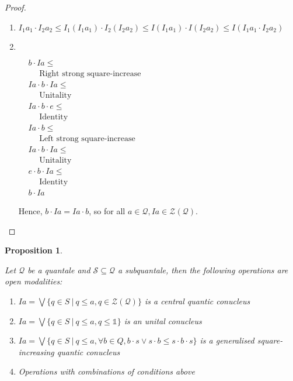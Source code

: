 \documentclass[a4paper]{article}
\theoremstyle{defin}
\theoremstyle{theorem}
\theoremstyle{prop}
\newtheorem{prop}{Proposition}
\theoremstyle{lemma}
\theoremstyle{ex}
\theoremstyle{col}
\begin{document}
\begin{proof}
$ $

\begin{enumerate}
  \item $I_1 a_1 \cdot I_2 a_2 \leq I_1 (I_1 a_1) \cdot I_2 (I_2 a_2) \leq I (I_1 a_1) \cdot I (I_2 a_2) \leq I (I_1 a_1 \cdot I_2 a_2)$
  \item $ $

    $\begin{array}{lll}
    & b \cdot I a \leq & \\
    & \:\:\:\:\:\: \text{Right strong square-increase}& \\
    &I a \cdot b \cdot I a \leq & \\
    & \:\:\:\:\:\: \text{Unitality}& \\
    & I a \cdot b \cdot e \leq & \\
    & \:\:\:\:\:\: \text{Identity}& \\
    &I a \cdot b \leq & \\
    & \:\:\:\:\:\: \text{Left strong square-increase}& \\
    &I a \cdot b \cdot I a \leq & \\
    & \:\:\:\:\:\: \text{Unitality}& \\
    &e \cdot b \cdot I a \leq & \\
    & \:\:\:\:\:\: \text{Identity}& \\
    &b \cdot I a&
    \end{array}$

  Hence, $b \cdot I a = I a \cdot b$, so for all $a \in \mathcal{Q}, I a \in \mathcal{Z}(\mathcal{Q})$.
\end{enumerate}
\end{proof}

\begin{prop}
$ $

Let $\mathcal{Q}$ be a quantale and $\mathcal{S} \subseteq \mathcal{Q}$ a subquantale, then the following operations are open modalities:

\begin{enumerate}
  \item $I a = \bigvee \{ q \in S \: | \: q \leq a, q \in \mathcal{Z}(\mathcal{Q}) \}$ is a central quantic conucleus
  \item $I a = \bigvee \{ q \in S \: | \: q \leq a, q \leq \mathds{1} \}$ is an unital conucleus
  \item $I a = \bigvee \{ q \in S \: | \: q \leq a, \forall b \in Q, b \cdot s \vee s \cdot b \leq s \cdot b \cdot s\}$ is a generalised square-increasing quantic conucleus
  \item Operations with combinations of conditions above
\end{enumerate}
\end{prop}
\end{document}
